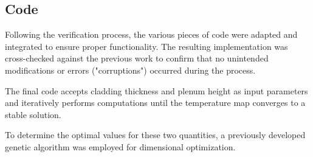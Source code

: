 \subsection{Code}

Following the verification process, the various pieces of code were adapted and integrated to ensure proper functionality. The resulting implementation was cross-checked against the previous work to confirm that no unintended modifications or errors ("corruptions") occurred during the process.

The final code accepts cladding thickness and plenum height as input parameters and iteratively performs computations until the temperature map converges to a stable solution.

To determine the optimal values for these two quantities, a previously developed genetic algorithm was employed for dimensional optimization.
